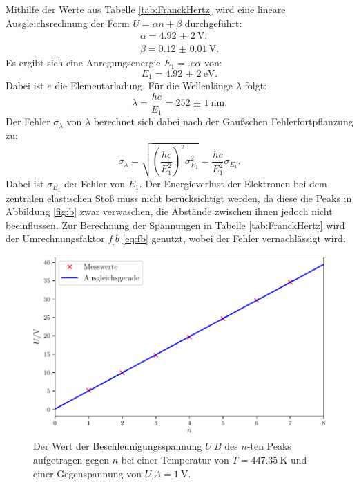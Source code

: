 Mithilfe der Werte aus Tabelle \ref{tab:FranckHertz} wird eine lineare Ausgleichsrechnung der Form \newline $U = \alpha n+\beta$ durchgeführt:
\begin{align*}
\alpha = \SI{4,92(2)}{\volt}\text{,}\\
\beta = \SI{0.12(1)}{\volt}\text{.}
\end{align*}
Es ergibt sich eine Anregungsenergie $E_1 = .e\alpha$ von:
\[
E_1 = \SI{4,92(2)}{\electronvolt}\text{.}
\]
Dabei ist $e$ \cite{nistgov} die Elementarladung. Für die Wellenlänge $\lambda$ folgt:
\[
\lambda = \frac{hc}{E_1} = \SI{252(1)}{\nano\metre}\text{.}
\]
Der Fehler $\sigma_\lambda$ von $\lambda$ berechnet sich dabei nach der Gaußschen Fehlerfortpflanzung zu:
\[
\sigma_\lambda = \sqrt{\left(\frac{hc}{E_1^2}\right)^2\sigma_{E_1}^2} = \frac{hc}{E_1^2}\sigma_{E_1} \text{.}
\]
Dabei ist $\sigma_{E_1}$ der Fehler von $E_1$.
Der Energieverlust der Elektronen bei dem zentralen elastischen Stoß muss nicht berücksichtigt werden, da diese die Peaks in Abbildung \ref{fig:b} zwar verwaschen, die Abstände zwischen ihnen jedoch nicht beeinflussen. Zur Berechnung der Spannungen in Tabelle \ref{tab:FranckHertz} wird der Umrechnungsfaktor $f_.b$ \eqref{eq:fb} genutzt, wobei der Fehler vernachlässigt wird. 

\begin{figure}
\centering
\includegraphics[width=\linewidth-70pt,height=\textheight-70pt,keepaspectratio]{content/images/fig3.pdf}
\caption{Der Wert der Beschleunigungsspannung $U_.B$ des $n$-ten Peaks aufgetragen gegen $n$ bei einer Temperatur von $T=\SI{447,35}{\kelvin}$ und einer Gegenspannung von $U_.A=\SI{1}{\volt}$.}
\label{fig:3}
\end{figure}

